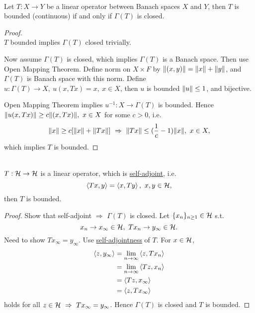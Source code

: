 \vspace{3pt}
\begin{proposition}\ \\
Let $T: X \to Y$ be a linear operator between Banach spaces $X$ and $Y$, then $T$ is bounded (continuous) if and only if $\Gamma(T)$ is closed.
\end{proposition}
\begin{proof}\ \\
$T$ bounded implies $\Gamma(T)$ closed trivially.

\np Now assume $\Gamma(T)$ is closed, which implies $\Gamma(T)$ is a Banach space. Then use Open Mapping Theorem. Define norm on $X \times F$ by $\norm{(x,y)} = \norm{x} + \norm{y}$, and $\Gamma(T)$ is Banach space with this norm. Define $u: \Gamma(T) \to X,\ u(x,Tx) = x,\ x \in X$, then $u$ is bounded $\norm{u} \leq 1$, and bijective.

\np Open Mapping Theorem implies $u^{-1}: X \to \Gamma(T)$ is bounded. Hence $\norm{u(x, Tx)} \geq c\norm{(x, Tx)},\ x \in X$ for some $c > 0$, i.e. 
\begin{equation*}
    \norm{x} \geq c[\norm{x} + \norm{Tx}]\ \Rightarrow\ \norm{Tx} \leq (\frac{1}{c} - 1) \norm{x},\ x \in X,
\end{equation*}
which implies $T$ is bounded.
\end{proof}


\vspace{3pt}
\begin{proposition}\ \\
$T: \mathcal{H} \to \mathcal{H}$ is a linear operator, which is \underline{self-adjoint}, i.e.
\begin{equation*}
    \left\langle Tx, y \right\rangle = \left\langle x, Ty \right\rangle,\ x,y \in \mathcal{H},
\end{equation*}
then $T$ is bounded.
\end{proposition}
\begin{proof}
Show that self-adjoint $\Rightarrow$ $\Gamma(T)$ is closed. Let $\{x_n\}_{n \geq 1} \in \mathcal{H}$ s.t.
\begin{equation*}
    x_n \to x_\infty \in \Hs,\ Tx_n \to y_\infty \in \Hs.
\end{equation*}
Need to show $Tx_\infty = y_\infty$. Use \underline{self-adjointness} of $T$. For $x \in \mathcal{H}$,
\begin{align*}
    \left\langle z, y_\infty \right\rangle &= \lim_{n \to \infty} \left\langle z, Tx_n \right\rangle\\
    &= \lim_{ n \to \infty} \left\langle Tz, x_n \right\rangle\\
    &= \left\langle Tz,  x_\infty \right\rangle\\
    &= \left\langle z, Tx_\infty \right\rangle
\end{align*}
holds for all $z \in \mathcal{H}\ \Rightarrow\ Tx_\infty = y_\infty$. Hence $\Gamma(T)$ is closed and $T$ is bounded.
\end{proof}


